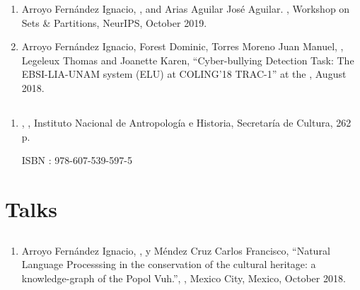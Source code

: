 \documentclass{curriculum-vitae}
\begin{document}
    \begin{enumerate}
      \item
        Arroyo Fernández Ignacio, , and Arias
        Aguilar José Aguilar. ,
        Workshop on Sets \& Partitions, NeurIPS, October 2019.

      \item
        Arroyo Fernández Ignacio, Forest Dominic, Torres Moreno Juan Manuel,
        , Legeleux Thomas and Joanette Karen,
        ``Cyber-bullying Detection Task: The EBSI-LIA-UNAM system (ELU) at
        COLING'18 TRAC-1'' at the , August 2018.
    \end{enumerate}

    \subsection{}

    \begin{enumerate}
      \item
        ,
        ,
        Instituto Nacional de Antropología e Historia, Secretaría de Cultura,
        262 p.

        ISBN : 978-607-539-597-5
    \end{enumerate}

  \section{Talks}

    \subsection{}

    \begin{enumerate}
      \item
        Arroyo Fernández Ignacio, , y Méndez Cruz
        Carlos Francisco,
        ``Natural Language Processsing in the conservation of the cultural
        heritage: a knowledge-graph of the Popol Vuh.'',
        , Mexico City, Mexico, October 2018.
    \end{enumerate}
\end{document}
